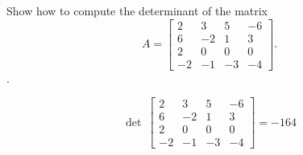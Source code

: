 
\begin{exerciseStatement}


Show how to compute the determinant of the matrix \[A= \left[\begin{array}{cccc}
2 & 3 & 5 & -6 \\
6 & -2 & 1 & 3 \\
2 & 0 & 0 & 0 \\
-2 & -1 & -3 & -4
\end{array}\right] .\].


\end{exerciseStatement}
    
\begin{exerciseAnswer} 
\[\operatorname{det}\  \left[\begin{array}{cccc}
2 & 3 & 5 & -6 \\
6 & -2 & 1 & 3 \\
2 & 0 & 0 & 0 \\
-2 & -1 & -3 & -4
\end{array}\right] = -164 \]
\end{exerciseAnswer}
    
